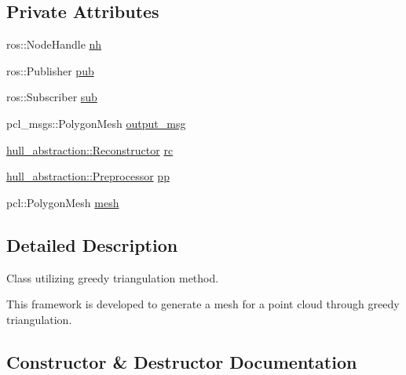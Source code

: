 \subsection*{Private Attributes}
\begin{DoxyCompactItemize}
\item 
ros\+::\+Node\+Handle \hyperlink{classgreedy__triangulation_1_1_greedy_triangulation_aaf891e65ede2c18d5f20fbfeadcd2083}{nh}
\item 
ros\+::\+Publisher \hyperlink{classgreedy__triangulation_1_1_greedy_triangulation_a6ca8884fc1b5b2fcd5fc4c9c7c290451}{pub}
\item 
ros\+::\+Subscriber \hyperlink{classgreedy__triangulation_1_1_greedy_triangulation_afb3a088f4a5b177363eae83a1187ed58}{sub}
\item 
pcl\+\_\+msgs\+::\+Polygon\+Mesh \hyperlink{classgreedy__triangulation_1_1_greedy_triangulation_acd6529152058723f54dd5e9f1d0b040d}{output\+\_\+msg}
\item 
\hyperlink{classhull__abstraction_1_1_reconstructor}{hull\+\_\+abstraction\+::\+Reconstructor} \hyperlink{classgreedy__triangulation_1_1_greedy_triangulation_a69a1c245b9985fe03482884cf54b851d}{rc}
\item 
\hyperlink{classhull__abstraction_1_1_preprocessor}{hull\+\_\+abstraction\+::\+Preprocessor} \hyperlink{classgreedy__triangulation_1_1_greedy_triangulation_a9f5ea346f74bd3352a341319a6bb2e53}{pp}
\item 
pcl\+::\+Polygon\+Mesh \hyperlink{classgreedy__triangulation_1_1_greedy_triangulation_a0262f92de8d002b650dbc1b05ebe67dc}{mesh}
\end{DoxyCompactItemize}


\subsection{Detailed Description}
Class utilizing greedy triangulation method. 

This framework is developed to generate a mesh for a point cloud through greedy triangulation. 

\subsection{Constructor \& Destructor Documentation}
